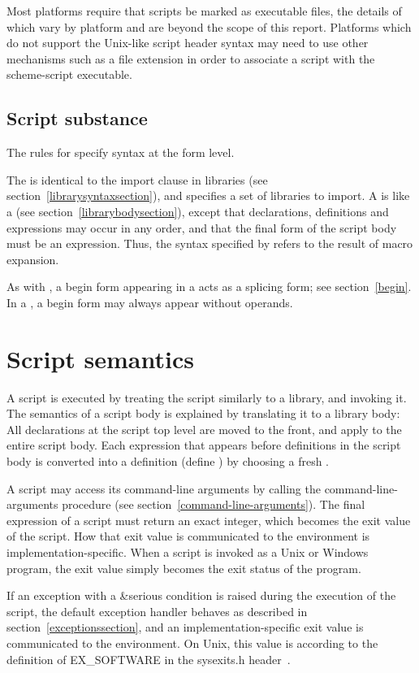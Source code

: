 Most platforms require that scripts be marked as executable files, the 
details of which vary by platform and are beyond the scope of this report. 
Platforms which do not support the Unix-like script header syntax may need 
to use other mechanisms such as a file extension in order to associate a 
script with the {\cf scheme-script} executable.

\subsection{Script substance}

The rules for  specify syntax at the form level.

The  is identical to the import clause in
libraries (see section~\ref{librarysyntaxsection}), 
and specifies a set of libraries to import.  A  is like a  (see
section~\ref{librarybodysection}), except that declarations,
definitions and expressions may occur in any order, and that the final
form of the script body must be an expression.  Thus, the syntax
specified by  refers to the result of macro
expansion.

As with , a {\cf begin} form appearing in a
 acts as a splicing form; see section~\ref{begin}.
In a , a {\cf begin} form may always appear without
operands.

\section{Script semantics}

A script is executed by treating the script similarly to a library, and
invoking it.  The semantics of a script body is explained by
translating it to a library body: All declarations at the script top
level are moved to the front, and apply to the entire script body.
Each expression  that appears before definitions in
the script body is converted into a definition {\cf (define 
  )} by choosing a fresh .

A script may access its command-line arguments by calling the {\cf
  command-line-arguments} procedure (see
section~\ref{command-line-arguments}).  The final expression of a
script must return an exact integer, which becomes the exit value of
the script.  How that exit value is communicated to the environment is
implementation-specific.  When a script is invoked as a Unix or
Windows program, the exit value simply becomes the exit status of the
program.

If an exception with a {\cf\&serious} condition is raised during the
execution of the script, the default exception handler behaves as
described in section~\ref{exceptionssection}, and an
implementation-specific exit value is communicated to the
environment.  On Unix, this value is according to the definition of
{\cf EX\_SOFTWARE} in the {\cf sysexits.h} header~\cite{srfi22}.

